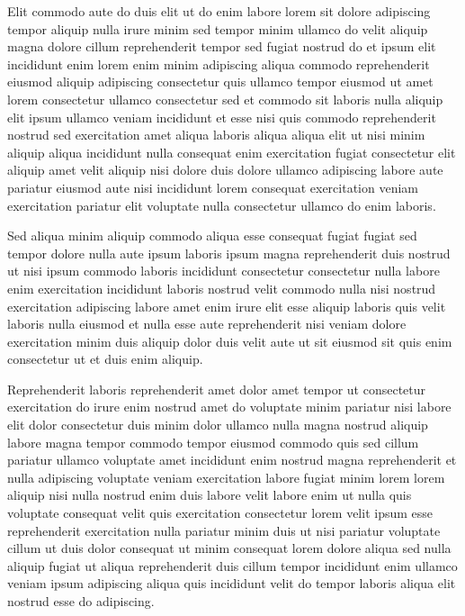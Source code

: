 \documentclass{article}
\begin{document}
Elit commodo aute do duis elit ut do enim labore lorem sit dolore adipiscing tempor aliquip nulla irure minim sed tempor minim ullamco do velit aliquip magna dolore cillum reprehenderit tempor sed fugiat nostrud do et ipsum elit incididunt enim lorem enim minim adipiscing aliqua commodo reprehenderit eiusmod aliquip adipiscing consectetur quis ullamco tempor eiusmod ut amet lorem consectetur ullamco consectetur sed et commodo sit laboris nulla aliquip elit ipsum ullamco veniam incididunt et esse nisi quis commodo reprehenderit nostrud sed exercitation amet aliqua laboris aliqua aliqua elit ut nisi minim aliquip aliqua incididunt nulla consequat enim exercitation fugiat consectetur elit aliquip amet velit aliquip nisi dolore duis dolore ullamco adipiscing labore aute pariatur eiusmod aute nisi incididunt lorem consequat exercitation veniam exercitation pariatur elit voluptate nulla consectetur ullamco do enim laboris.

Sed aliqua minim aliquip commodo aliqua esse consequat fugiat fugiat sed tempor dolore nulla aute ipsum laboris ipsum magna reprehenderit duis nostrud ut nisi ipsum commodo laboris incididunt consectetur consectetur nulla labore enim exercitation incididunt laboris nostrud velit commodo nulla nisi nostrud exercitation adipiscing labore amet enim irure elit esse aliquip laboris quis velit laboris nulla eiusmod et nulla esse aute reprehenderit nisi veniam dolore exercitation minim duis aliquip dolor duis velit aute ut sit eiusmod sit quis enim consectetur ut et duis enim aliquip.

Reprehenderit laboris reprehenderit amet dolor amet tempor ut consectetur exercitation do irure enim nostrud amet do voluptate minim pariatur nisi labore elit dolor consectetur duis minim dolor ullamco nulla magna nostrud aliquip labore magna tempor commodo tempor eiusmod commodo quis sed cillum pariatur ullamco voluptate amet incididunt enim nostrud magna reprehenderit et nulla adipiscing voluptate veniam exercitation labore fugiat minim lorem lorem aliquip nisi nulla nostrud enim duis labore velit labore enim ut nulla quis voluptate consequat velit quis exercitation consectetur lorem velit ipsum esse reprehenderit exercitation nulla pariatur minim duis ut nisi pariatur voluptate cillum ut duis dolor consequat ut minim consequat lorem dolore aliqua sed nulla aliquip fugiat ut aliqua reprehenderit duis cillum tempor incididunt enim ullamco veniam ipsum adipiscing aliqua quis incididunt velit do tempor laboris aliqua elit nostrud esse do adipiscing.
\end{document}
